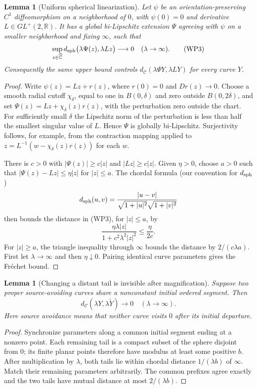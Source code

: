 \documentclass[11pt]{article}
\newtheorem{lemma}[theorem]{Lemma}
\theoremstyle{definition}\newtheorem{definition}[theorem]{Definition}
\theoremstyle{remark}\newtheorem{remark}[theorem]{Remark}
\newcommand{\RR}{\mathbb R}
\begin{document}
\begin{lemma}[Uniform spherical linearization]
\label{lem:wp-spherical-linearization}
Let $\psi$ be an orientation-preserving $C^1$ diffeomorphism on a
neighborhood of $0$, with $\psi(0)=0$ and derivative $L\in GL^+(2,\RR)$.
It has a global bi-Lipschitz extension $\Psi$ agreeing with $\psi$ on
a smaller neighborhood and fixing $\infty$, such that
\[
 \sup_{z\in\widehat{\mathbb C}}
 d_{\rm sph}\bigl(\lambda\Psi(z),\lambda Lz\bigr)
       \longrightarrow0\quad(\lambda\to\infty).
 \tag{WP3}
\]
Consequently the same upper bound controls
$d_{\mathcal C}(\lambda\Psi Y,\lambda LY)$ for every curve $Y$.
\end{lemma}
\begin{proof}
Write $\psi(z)=Lz+r(z)$, where $r(0)=0$ and $Dr(z)\to0$.
Choose a smooth radial cutoff $\chi_\delta$, equal to one in
$B(0,\delta)$ and zero outside $B(0,2\delta)$, and set
$\Psi(z)=Lz+\chi_\delta(z)r(z)$, with the perturbation zero outside
the chart.  For sufficiently small $\delta$ the Lipschitz norm of
the perturbation is less than half the smallest singular value of
$L$.  Hence $\Psi$ is globally bi-Lipschitz.  Surjectivity follows,
for example, from the contraction mapping applied to
$z=L^{-1}(w-\chi_\delta(z)r(z))$ for each $w$.

There is $c>0$ with $|\Psi(z)|\ge c|z|$ and $|Lz|\ge c|z|$.
Given $\eta>0$, choose $a>0$ such that
$|\Psi(z)-Lz|\le\eta|z|$ for $|z|\le a$.
The chordal formula (our convention for $d_{\rm sph}$)
\[
 d_{\rm sph}(u,v)=
 \frac{|u-v|}{\sqrt{1+|u|^2}\sqrt{1+|v|^2}}
\]
then bounds the distance in (WP3), for $|z|\le a$, by
\[
 \frac{\eta\lambda|z|}{1+c^2\lambda^2|z|^2}
       \le\frac{\eta}{2c}.
\]
For $|z|\ge a$, the triangle inequality through $\infty$ bounds
the distance by $2/(c\lambda a)$.  First let $\lambda\to\infty$
and then $\eta\downarrow0$.  Pairing identical curve parameters
gives the Fr\'echet bound.
\end{proof}

\begin{lemma}[Changing a distant tail is invisible after magnification]
\label{lem:wp-tail-replacement}
Suppose two proper source-avoiding curves share a nonconstant initial
ordered segment.  Then
\[
 d_{\mathcal C}(\lambda Y,\lambda\widetilde Y)
       \longrightarrow0\quad(\lambda\to\infty).
 \tag{WP4}
\]
Here source avoidance means that neither curve visits $0$ after its
initial departure.
\end{lemma}
\begin{proof}
Synchronize parameters along a common initial segment ending at a
nonzero point.  Each remaining tail is a compact subset of the sphere
disjoint from $0$; its finite planar points therefore have modulus at
least some positive $b$.  After multiplication by $\lambda$, both
tails lie within chordal distance $1/(\lambda b)$ of $\infty$.
Match their remaining parameters arbitrarily.  The common prefixes
agree exactly and the two tails have mutual distance at most
$2/(\lambda b)$.
\end{proof}
\end{document}
